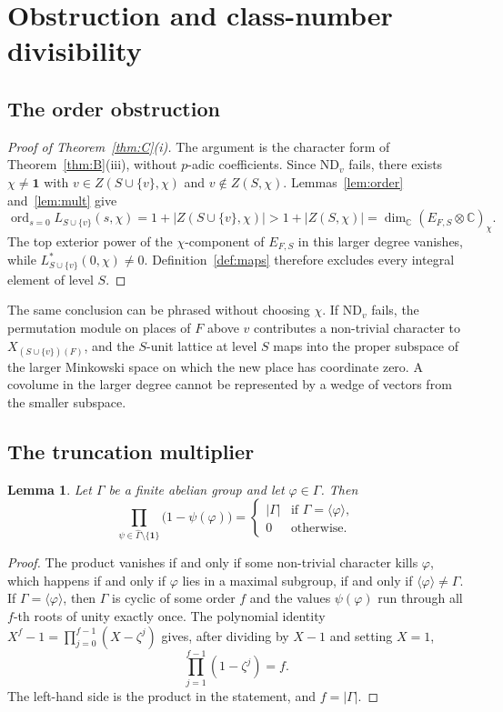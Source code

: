 \documentclass[11pt]{article}
\theoremstyle{plain}
\newtheorem{lemma}[theorem]{Lemma}
\theoremstyle{definition}
\theoremstyle{remark}
\newcommand{\C}{\mathbb{C}}
\newcommand{\ord}{\operatorname{ord}}
\newcommand{\triv}{\mathbf{1}}
\begin{document}
\section{Obstruction and class-number divisibility}
\label{sec:thmC}

\subsection{The order obstruction}

\begin{proof}[Proof of Theorem~\ref{thm:C}(i)]
The argument is the character form of Theorem~\ref{thm:B}(iii), without $p$-adic coefficients.
Since $\mathrm{ND}_v$ fails, there exists $\chi\neq\triv$ with $v\in Z(S\cup\{v\},\chi)$ and $v\notin Z(S,\chi)$.
Lemmas~\ref{lem:order} and~\ref{lem:mult} give
\[
  \ord_{s=0}L_{S\cup\{v\}}(s,\chi)
  =1+|Z(S\cup\{v\},\chi)|
  >1+|Z(S,\chi)|
  =\dim_{\C}(E_{F,S}\otimes\C)_{\chi}.
\]
The top exterior power of the $\chi$-component of $E_{F,S}$ in this larger degree vanishes, while $L_{S\cup\{v\}}^{*}(0,\chi)\neq 0$.
Definition~\ref{def:maps} therefore excludes every integral element of level $S$.
\end{proof}

The same conclusion can be phrased without choosing $\chi$.
If $\mathrm{ND}_v$ fails, the permutation module on places of $F$ above $v$ contributes a non-trivial character to $X_{(S\cup\{v\})(F)}$, and the $S$-unit lattice at level $S$ maps into the proper subspace of the larger Minkowski space on which the new place has coordinate zero.
A covolume in the larger degree cannot be represented by a wedge of vectors from the smaller subspace.

\subsection{The truncation multiplier}

\begin{lemma}
\label{lem:cyclotomic-product}
Let $\Gamma$ be a finite abelian group and let $\varphi\in\Gamma$.
Then
\[
  \prod_{\psi\in\widehat\Gamma\setminus\{\triv\}}\bigl(1-\psi(\varphi)\bigr)
  =
  \begin{cases}
    |\Gamma|& \text{if }\Gamma=\langle\varphi\rangle,\\
    0& \text{otherwise.}
  \end{cases}
\]
\end{lemma}

\begin{proof}
The product vanishes if and only if some non-trivial character kills $\varphi$, which happens if and only if $\varphi$ lies in a maximal subgroup, if and only if $\langle\varphi\rangle\neq\Gamma$.
If $\Gamma=\langle\varphi\rangle$, then $\Gamma$ is cyclic of some order $f$ and the values $\psi(\varphi)$ run through all $f$-th roots of unity exactly once.
The polynomial identity $X^{f}-1=\prod_{j=0}^{f-1}(X-\zeta^{j})$ gives, after dividing by $X-1$ and setting $X=1$,
\[
  \prod_{j=1}^{f-1}(1-\zeta^{j})=f.
\]
The left-hand side is the product in the statement, and $f=|\Gamma|$.
\end{proof}
\end{document}
